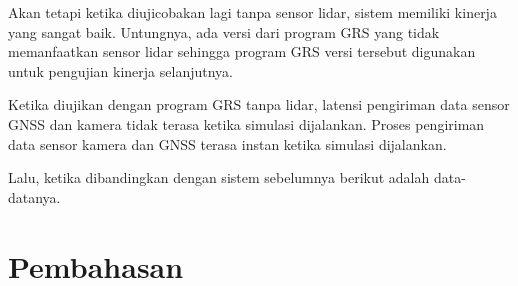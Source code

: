 Akan tetapi ketika diujicobakan lagi tanpa sensor lidar, sistem memiliki kinerja
yang sangat baik. Untungnya, ada versi dari program GRS yang tidak memanfaatkan
sensor lidar sehingga program GRS versi tersebut digunakan untuk pengujian
kinerja selanjutnya.

Ketika diujikan dengan program GRS tanpa lidar, latensi pengiriman data sensor
GNSS dan kamera tidak terasa ketika simulasi dijalankan. Proses pengiriman data
sensor kamera dan GNSS terasa instan ketika simulasi dijalankan.

Lalu, ketika dibandingkan dengan sistem sebelumnya berikut adalah data-datanya.

\section{Pembahasan}
\blindtext
